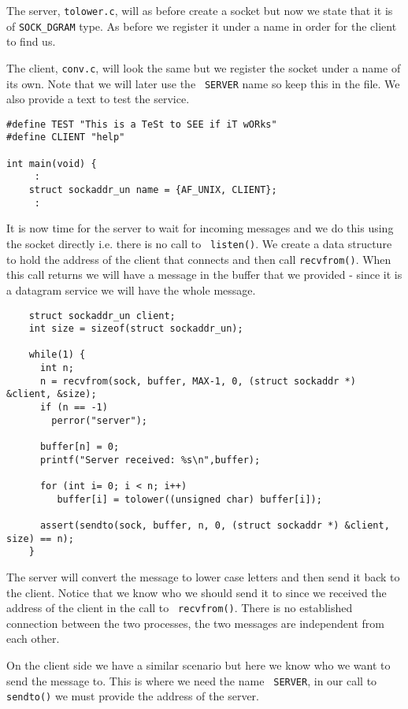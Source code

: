\documentclass[a4paper,11pt]{article}
\begin{document}
The server, {\tt tolower.c}, will as before create a socket but now we
state that it is of {\tt SOCK\_DGRAM} type. As before we register it
under a name in order for the client to find us. 

The client, {\tt conv.c}, will look the same but we register the
socket under a name of its own. Note that we will later use the {\tt
  SERVER} name so keep this in the file. We also provide a text to
test the service.

\begin{lstlisting}
#define TEST "This is a TeSt to SEE if iT wORks"
#define CLIENT "help"

int main(void) {
     :
    struct sockaddr_un name = {AF_UNIX, CLIENT};
     :
\end{lstlisting}

It is now time for the server to wait for incoming messages and we do
this using the socket directly i.e. there is no call to {\tt
  listen()}. We create a data structure to hold the address of the
client that connects and then call {\tt recvfrom()}. When this call
returns we will have a message in the buffer that we provided - since
it is a datagram service we will have the whole message.

\begin{lstlisting}
    struct sockaddr_un client;
    int size = sizeof(struct sockaddr_un);
    
    while(1) {
      int n;
      n = recvfrom(sock, buffer, MAX-1, 0, (struct sockaddr *) &client, &size);
      if (n == -1)
        perror("server");

      buffer[n] = 0;
      printf("Server received: %s\n",buffer);
	
      for (int i= 0; i < n; i++)
         buffer[i] = tolower((unsigned char) buffer[i]);

      assert(sendto(sock, buffer, n, 0, (struct sockaddr *) &client, size) == n);
    }
\end{lstlisting}

The server will convert the message to lower case letters and then
send it back to the client. Notice that we know who we should send it
to since we received the address of the client in the call to {\tt
  recvfrom()}. There is no established connection between the two
processes, the two messages are independent from each other.

On the client side we have a similar scenario but here we know who we
want to send the message to. This is where we need the name {\tt
  SERVER}, in our call to {\tt sendto()} we must provide the address
of the server.
\end{document}
